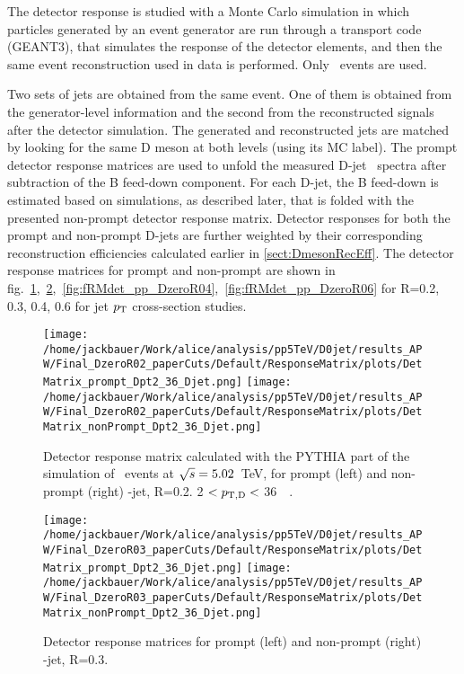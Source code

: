 The detector response is studied with a Monte Carlo simulation in which particles generated by an event generator are run through a transport code (GEANT3), that simulates the response of the detector elements, and then the same event reconstruction used in data is performed. Only \ccbar\ events are used.

Two sets of jets are obtained from the same event. One of them is obtained from the generator-level information and the second from the reconstructed signals after the detector simulation. 
The generated and reconstructed jets are matched by looking for the same D meson at both levels (using its MC label).
The prompt detector response matrices are used to unfold the measured D-jet \pt\ spectra after subtraction of the B feed-down component. 
For each D-jet, the B feed-down is estimated based on simulations, as described later, that is folded with the presented non-prompt detector response matrix.
Detector responses for both the prompt and non-prompt D-jets are further weighted by their corresponding reconstruction efficiencies calculated earlier in \ref{sect:DmesonRecEff}. 
The detector response matrices for prompt and non-prompt are shown in fig.~\ref{fig:fRMdet_pp_DzeroR02},~\ref{fig:fRMdet_pp_DzeroR03},~\ref{fig:fRMdet_pp_DzeroR04},~\ref{fig:fRMdet_pp_DzeroR06} for R=0.2, 0.3, 0.4, 0.6 for jet $p_{\text T}$ cross-section studies.

\begin{figure}[bth]
\centering
\texttt{[image: /home/jackbauer/Work/alice/analysis/pp5TeV/D0jet/results\_APW/Final\_DzeroR02\_paperCuts/Default/ResponseMatrix/plots/DetMatrix\_prompt\_Dpt2\_36\_Djet.png]}
\texttt{[image: /home/jackbauer/Work/alice/analysis/pp5TeV/D0jet/results\_APW/Final\_DzeroR02\_paperCuts/Default/ResponseMatrix/plots/DetMatrix\_nonPrompt\_Dpt2\_36\_Djet.png]}
\caption{Detector response matrix calculated with the PYTHIA part of the simulation of \pp\ events at $\sqrt{s}=5.02$~TeV, for prompt (left) and non-prompt (right) \Dzero-jet, R=0.2. 2 $< p_{\mathrm{T,D}} < $ 36~\GeVc\ .}
\label{fig:fRMdet_pp_DzeroR02}
\end{figure}

\begin{figure}[bth]
\centering
\texttt{[image: /home/jackbauer/Work/alice/analysis/pp5TeV/D0jet/results\_APW/Final\_DzeroR03\_paperCuts/Default/ResponseMatrix/plots/DetMatrix\_prompt\_Dpt2\_36\_Djet.png]}
\texttt{[image: /home/jackbauer/Work/alice/analysis/pp5TeV/D0jet/results\_APW/Final\_DzeroR03\_paperCuts/Default/ResponseMatrix/plots/DetMatrix\_nonPrompt\_Dpt2\_36\_Djet.png]}
\caption{Detector response matrices for prompt (left) and non-prompt (right) \Dzero-jet, R=0.3.}
\label{fig:fRMdet_pp_DzeroR03}
\end{figure}

